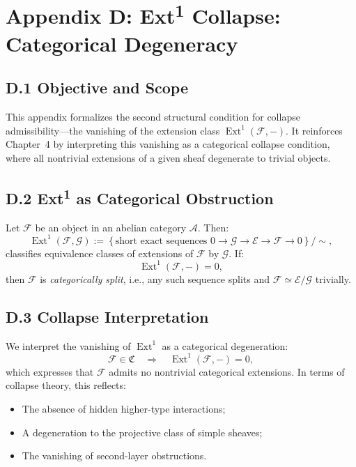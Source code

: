\documentclass[11pt]{article}
\DeclareMathOperator{\Ext}{Ext}
\begin{document}
\appendix
\section*{Appendix D: Ext\textsuperscript{1} Collapse: Categorical Degeneracy}

\subsection*{D.1 Objective and Scope}

This appendix formalizes the second structural condition for collapse admissibility—the vanishing of the extension class \( \Ext^1(\mathcal{F}, -) \). It reinforces Chapter~4 by interpreting this vanishing as a categorical collapse condition, where all nontrivial extensions of a given sheaf degenerate to trivial objects.

\subsection*{D.2 Ext\textsuperscript{1} as Categorical Obstruction}

Let \( \mathcal{F} \) be an object in an abelian category \( \mathcal{A} \). Then:
\[
\Ext^1(\mathcal{F}, \mathcal{G}) := \left\{ \text{short exact sequences } 0 \to \mathcal{G} \to \mathcal{E} \to \mathcal{F} \to 0 \right\} / \sim,
\]
classifies equivalence classes of extensions of \( \mathcal{F} \) by \( \mathcal{G} \). If:
\[
\Ext^1(\mathcal{F}, -) = 0,
\]
then \( \mathcal{F} \) is \emph{categorically split}, i.e., any such sequence splits and \( \mathcal{F} \simeq \mathcal{E}/\mathcal{G} \) trivially.

\subsection*{D.3 Collapse Interpretation}

We interpret the vanishing of \( \Ext^1 \) as a categorical degeneration:
\[
\mathcal{F} \in \mathfrak{C} \quad \Rightarrow \quad \Ext^1(\mathcal{F}, -) = 0,
\]
which expresses that \( \mathcal{F} \) admits no nontrivial categorical extensions. In terms of collapse theory, this reflects:
\begin{itemize}
  \item The absence of hidden higher-type interactions;
  \item A degeneration to the projective class of simple sheaves;
  \item The vanishing of second-layer obstructions.
\end{itemize}
\end{document}
